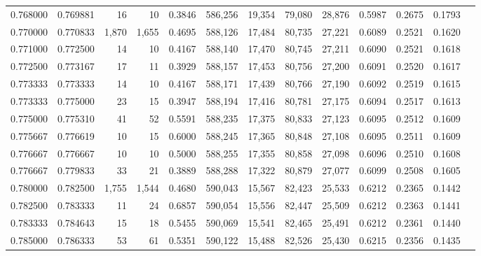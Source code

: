 \begin{tabular}{rrrrrrrrrrrrr}
0.768000 & 0.769881 &     16 &    10 &                                     0.3846 & 586,256 &  19,354 &  79,080 &  28,876 & 0.5987 & 0.2675 & 0.1793 \\
0.770000 & 0.770833 &  1,870 & 1,655 &                                     0.4695 & 588,126 &  17,484 &  80,735 &  27,221 & 0.6089 & 0.2521 & 0.1620 \\
0.771000 & 0.772500 &     14 &    10 &                                     0.4167 & 588,140 &  17,470 &  80,745 &  27,211 & 0.6090 & 0.2521 & 0.1618 \\
0.772500 & 0.773167 &     17 &    11 &                                     0.3929 & 588,157 &  17,453 &  80,756 &  27,200 & 0.6091 & 0.2520 & 0.1617 \\
0.773333 & 0.773333 &     14 &    10 &                                     0.4167 & 588,171 &  17,439 &  80,766 &  27,190 & 0.6092 & 0.2519 & 0.1615 \\
0.773333 & 0.775000 &     23 &    15 &                                     0.3947 & 588,194 &  17,416 &  80,781 &  27,175 & 0.6094 & 0.2517 & 0.1613 \\
0.775000 & 0.775310 &     41 &    52 &                                     0.5591 & 588,235 &  17,375 &  80,833 &  27,123 & 0.6095 & 0.2512 & 0.1609 \\
0.775667 & 0.776619 &     10 &    15 &                                     0.6000 & 588,245 &  17,365 &  80,848 &  27,108 & 0.6095 & 0.2511 & 0.1609 \\
0.776667 & 0.776667 &     10 &    10 &                                     0.5000 & 588,255 &  17,355 &  80,858 &  27,098 & 0.6096 & 0.2510 & 0.1608 \\
0.776667 & 0.779833 &     33 &    21 &                                     0.3889 & 588,288 &  17,322 &  80,879 &  27,077 & 0.6099 & 0.2508 & 0.1605 \\
0.780000 & 0.782500 &  1,755 & 1,544 &                                     0.4680 & 590,043 &  15,567 &  82,423 &  25,533 & 0.6212 & 0.2365 & 0.1442 \\
0.782500 & 0.783333 &     11 &    24 &                                     0.6857 & 590,054 &  15,556 &  82,447 &  25,509 & 0.6212 & 0.2363 & 0.1441 \\
0.783333 & 0.784643 &     15 &    18 &                                     0.5455 & 590,069 &  15,541 &  82,465 &  25,491 & 0.6212 & 0.2361 & 0.1440 \\
0.785000 & 0.786333 &     53 &    61 &                                     0.5351 & 590,122 &  15,488 &  82,526 &  25,430 & 0.6215 & 0.2356 & 0.1435 \\

\end{tabular}
